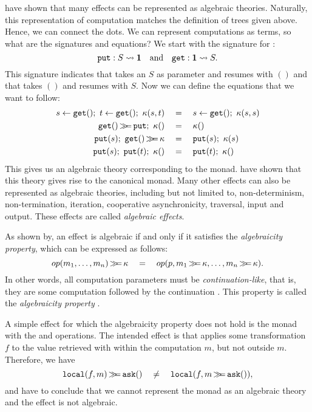 \textcite{goos_adequacy_2001} have shown that many effects can be represented as algebraic theories.
Naturally, this representation of computation matches the definition of trees given above. Hence, we can connect the dots. We can represent computations as terms, so what are the signatures and equations? We start with the signature for :
\[
    \mathtt{put} : S \rightsquigarrow \mathbf{1}
    \quad\text{and}\quad
    \mathtt{get} : \mathbf{1} \rightsquigarrow S.
\]
This signature indicates that \oput takes an $S$ as parameter and resumes with $()$ and that \oget takes $()$ and resumes with $S$. Now we can define the equations that we want  to follow:
\begin{align*}
    s \gets \mathtt{get}() ;\  t \gets \mathtt{get}() ;\  \kappa(s,t)
        &\quad=\quad s \gets \mathtt{get}();\  \kappa(s, s) \\
    \mathtt{get}()\operatorname{\mathtt{\gg\!\!=}} \mathtt{put};\  \kappa() &\quad=\quad \kappa () \\
    \mathtt{put}(s);\  \mathtt{get}()\operatorname{\mathtt{\gg\!\!=}} \kappa &\quad=\quad \mathtt{put}(s);\  \kappa(s) \\
    \mathtt{put}(s);\  \mathtt{put}(t);\  \kappa() &\quad=\quad \mathtt{put}(t);\  \kappa()
\end{align*}
This gives us an algebraic theory corresponding to the  monad. \textcite{goos_adequacy_2001} have shown that this theory gives rise to the canonical  monad. Many other effects can also be represented as algebraic theories, including but not limited to, non-determinism, non-termination, iteration, cooperative asynchronicity, traversal, input and output\citationneeded. These effects are called \emph{algebraic effects}.

As shown by\textcite{plotkin_algebraic_2003},  an effect is algebraic if and only if it satisfies the \emph{algebraicity property}, which can be expressed as follows:
\[
    op(m_1, \dots, m_n) \operatorname{\mathtt{\gg\!\!=}} \kappa \quad=\quad op(p, m_1\operatorname{\mathtt{\gg\!\!=}} \kappa, \dots, m_n\operatorname{\mathtt{\gg\!\!=}}\kappa).
\]
In other words, all computation parameters must be \emph{continuation-like}, that is, they are some computation followed by the continuation \autocite{bach_poulsen_hefty_2023}. This property is called the \emph{algebraicity property} \autocite{plotkin_algebraic_2003}.

A simple effect for which the algebraicity property does not hold is the  monad with the \olocal and \oask operations. The intended effect is that \olocal applies some transformation $f$ to the value retrieved with \oask within the computation $m$, but not outside $m$. Therefore, we have
\[
    \mathtt{local}(f, m) \operatorname{\mathtt{\gg\!\!=}} \mathtt{ask}() \quad\neq\quad \mathtt{local}(f, m \operatorname{\mathtt{\gg\!\!=}} \mathtt{ask}()),
\]
and have to conclude that we cannot represent the  monad as an algebraic theory and the effect is not algebraic.

